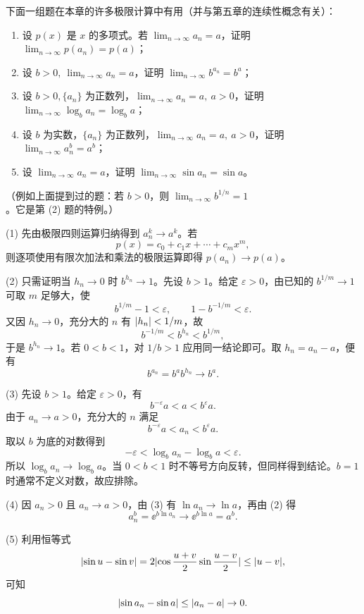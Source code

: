 \begin{xexercise}[4]
下面一组题在本章的许多极限计算中有用（并与第五章的连续性概念有关）：
  \begin{enumerate}[label=(\arabic*)]
    \item 设 $p(x)$ 是 $x$ 的多项式。若 $\displaystyle\lim_{n\to\infty}a_n=a$，证明 $\displaystyle\lim_{n\to\infty}p(a_n)=p(a)$；
    \item 设 $b>0,\ \displaystyle\lim_{n\to\infty}a_n=a$，证明 $\displaystyle\lim_{n\to\infty}b^{a_n}=b^a$；
    \item 设 $b>0,\{a_n\}$ 为正数列，$\displaystyle\lim_{n\to\infty}a_n=a,\ a>0$，证明 $\displaystyle\lim_{n\to\infty}\log_b a_n=\log_b a$；
    \item 设 $b$ 为实数，$\{a_n\}$ 为正数列，$\displaystyle\lim_{n\to\infty}a_n=a,\ a>0$，证明 $\displaystyle\lim_{n\to\infty}a_n^b=a^b$；
    \item 设 $\displaystyle\lim_{n\to\infty}a_n=a$，证明 $\displaystyle\lim_{n\to\infty}\sin a_n=\sin a$。
  \end{enumerate}
  （例如上面提到过的题：若 $b>0$，则 $\displaystyle\lim_{n\to\infty}b^{1/n}=1$。它是第 (2) 题的特例。）
\end{xexercise}
\begin{xsolution}
(1) 先由极限四则运算归纳得到 $a_n^k\to a^k$。若
\[
  p(x)=c_0+c_1x+\cdots+c_mx^m,
\]
则逐项使用有限次加法和乘法的极限运算即得 $p(a_n)\to p(a)$。

(2) 只需证明当 $h_n\to0$ 时 $b^{h_n}\to1$。先设 $b>1$。给定 $\varepsilon>0$，由已知的 $b^{1/m}\to1$ 可取 $m$ 足够大，使
\[
  b^{1/m}-1<\varepsilon,
  \qquad
  1-b^{-1/m}<\varepsilon.
\]
又因 $h_n\to0$，充分大的 $n$ 有 $\lvert h_n\rvert<1/m$，故
\[
  b^{-1/m}<b^{h_n}<b^{1/m},
\]
于是 $b^{h_n}\to1$。若 $0<b<1$，对 $1/b>1$ 应用同一结论即可。取 $h_n=a_n-a$，便有
\[
  b^{a_n}=b^a b^{h_n}\to b^a.
\]

(3) 先设 $b>1$。给定 $\varepsilon>0$，有
\[
  b^{-\varepsilon}a<a<b^{\varepsilon}a.
\]
由于 $a_n\to a>0$，充分大的 $n$ 满足
\[
  b^{-\varepsilon}a<a_n<b^{\varepsilon}a.
\]
取以 $b$ 为底的对数得到
\[
  -\varepsilon<\log_ba_n-\log_ba<\varepsilon.
\]
所以 $\log_ba_n\to\log_ba$。当 $0<b<1$ 时不等号方向反转，但同样得到结论。$b=1$ 时通常不定义对数，故应排除。

(4) 因 $a_n>0$ 且 $a_n\to a>0$，由 (3) 有 $\ln a_n\to\ln a$，再由 (2) 得
\[
  a_n^b=\ee^{b\ln a_n}\to\ee^{b\ln a}=a^b.
\]

(5) 利用恒等式
\[
  \lvert\sin u-\sin v\rvert
  =2\lvert\cos\frac{u+v}{2}\sin\frac{u-v}{2}\rvert
  \le\lvert u-v\rvert,
\]
可知
\[
  \lvert\sin a_n-\sin a\rvert\le\lvert a_n-a\rvert\to0.
\]
\end{xsolution}


